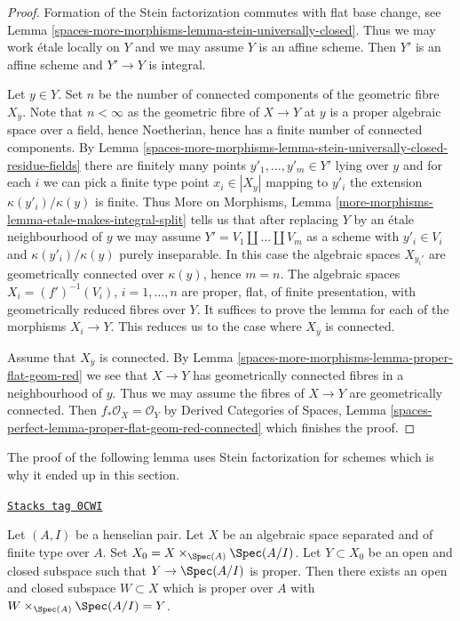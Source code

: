 \begin{proof}
Formation of the Stein factorization commutes with flat base change,
see Lemma \ref{spaces-more-morphisms-lemma-stein-universally-closed}.
Thus we may work \'etale locally on $Y$ and we may assume $Y$
is an affine scheme. Then $Y'$ is an affine scheme and $Y' \to Y$
is integral.

\medskip\noindent
Let $y \in Y$. Set $n$ be the number of connected components of
the geometric fibre $X_{\overline{y}}$. Note that $n < \infty$
as the geometric fibre of $X \to Y$ at $y$ is a proper
algebraic space over a field, hence Noetherian,
hence has a finite number of connected components.
By Lemma \ref{spaces-more-morphisms-lemma-stein-universally-closed-residue-fields}
there are finitely many points $y'_1, \ldots, y'_m \in Y'$ lying over $y$
and for each $i$ we can pick a finite type point $x_i \in |X_y|$
mapping to $y'_i$ the extension $\kappa(y'_i)/\kappa(y)$ is finite.
Thus More on Morphisms,
Lemma \ref{more-morphisms-lemma-etale-makes-integral-split}
tells us that after replacing $Y$ by an \'etale neighbourhood
of $y$ we may assume $Y' = V_1 \amalg \ldots \amalg V_m$ as a scheme
with $y'_i \in V_i$ and $\kappa(y'_i)/\kappa(y)$ purely inseparable.
In this case the algebraic spaces $X_{y_i'}$
are geometrically connected over $\kappa(y)$, hence $m = n$.
The algebraic spaces $X_i = (f')^{-1}(V_i)$, $i = 1, \ldots, n$
are proper, flat, of finite presentation, with geometrically
reduced fibres over $Y$. It suffices to prove the lemma
for each of the morphisms $X_i \to Y$. This reduces us to the case where
$X_{\overline{y}}$ is connected.

\medskip\noindent
Assume that $X_{\overline{y}}$ is connected. By
Lemma \ref{spaces-more-morphisms-lemma-proper-flat-geom-red}
we see that $X \to Y$ has geometrically connected
fibres in a neighbourhood of $y$. Thus
we may assume the fibres of $X \to Y$ are geometrically connected.
Then $f_*\mathcal{O}_X = \mathcal{O}_Y$ by
Derived Categories of Spaces, Lemma
\ref{spaces-perfect-lemma-proper-flat-geom-red-connected}
which finishes the proof.
\end{proof}

The proof of the following lemma uses Stein factorization for schemes
which is why it ended up in this section.

\begin{lemma}
\label{spaces-more-morphisms-lemma-split-off-proper-part-henselian}
\href{https://stacks.math.columbia.edu/tag/0CWI}{\texttt{Stacks tag 0CWI}}

Let $(A, I)$ be a henselian pair. Let $X$ be an algebraic space
separated and of finite type over $A$. Set
$X_0 = X \times_{\Spec(A)} \Spec(A/I)$.
Let $Y \subset X_0$ be an open and closed subspace such that
$Y \to \Spec(A/I)$ is proper. Then there exists an open and closed
subspace $W \subset X$ which is proper over $A$ with
$W \times_{\Spec(A)} \Spec(A/I) = Y$.
\end{lemma}

